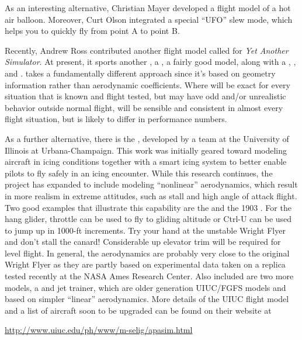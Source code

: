 As an interesting alternative, Christian Mayer developed a flight model of a hot air
balloon. Moreover, Curt Olson integrated a special ``UFO'' slew mode, which
helps you to quickly fly from point A to point B.

Recently, Andrew Ross contributed another flight model called \YASim{} for
\textit{Yet Another Simulator}. At present, it sports another , a
, a fairly good  model, along with a ,
, and . \YASim{} takes a fundamentally different approach since it's
based on geometry information rather than aerodynamic coefficients. Where \JSBSim{} will be exact for every situation that is known and flight tested, but may have odd and/or unrealistic behavior outside normal flight, \YASim{} will be sensible and consistent in almost every flight situation, but is likely to differ in performance numbers.

As a further alternative, there is the , developed by a 
team at the University of Illinois at Urbana-Champaign.  This work was 
initially geared toward modeling aircraft in icing conditions together with a smart icing system to better enable pilots to fly safely in an icing 
encounter.  While this research continues, the project has expanded to 
include modeling ``nonlinear'' aerodynamics, which result in more realism 
in extreme attitudes, such as stall and high angle of attack flight.  Two 
good examples that illustrate this capability are the  
 and the 1903 .  For the hang glider, throttle can 
be used to fly to gliding altitude or Ctrl-U can be used to jump up in 
1000-ft increments.  Try your hand at the unstable Wright Flyer and don't 
stall the canard!  Considerable up elevator trim will be required for level 
flight.  In general, the aerodynamics are probably very close to the 
original Wright Flyer as they are partly based on experimental data taken 
on a replica tested recently at the NASA Ames Research Center.  Also 
included are two more models, a  and  jet trainer, 
which are older generation UIUC/FGFS models and based on simpler ``linear'' 
aerodynamics.  More details of the UIUC flight model and a list of aircraft 
soon to be upgraded can be found on their website at
\medskip

\href{http://www.uiuc.edu/ph/www/m-selig/apasim.html}{http://www.uiuc.edu/ph/www/m-selig/apasim.html}
\medskip

